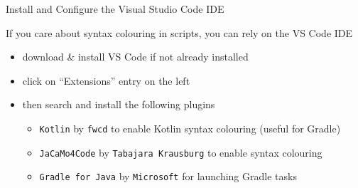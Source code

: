 \documentclass[presentation]{beamer}\mode<presentation>{\usetheme{AMSBolognaFC}}
\begin{document}
        
        
        
    

\begin{frame}[c]{Install and Configure the Visual Studio Code IDE}
    
    If you care about syntax colouring in \jason{} scripts, you can rely on the VS Code IDE
    \vfill
    \begin{itemize}
        \item download \& install VS Code if not already installed
        \begin{center}
        \end{center}
        
        \vfill
        
        \item click on \alert{``Extensions'' entry} on the left
        
        \vfill
        
        \item then search and install the following plugins
        \begin{itemize}
            \item \alert{\texttt{Kotlin}} by \texttt{fwcd} to enable Kotlin syntax colouring (useful for Gradle) 
            \item \alert{\texttt{JaCaMo4Code}} by \texttt{Tabajara Krausburg} to enable \jason{} syntax colouring
            \item \alert{\texttt{Gradle for Java}} by \texttt{Microsoft} for launching Gradle tasks
        \end{itemize}
    \end{itemize}
    
\end{frame}
\end{document}
